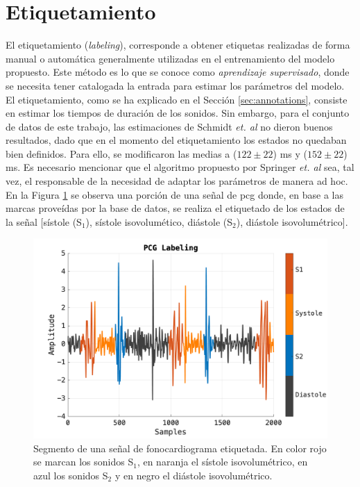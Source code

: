 \section{Etiquetamiento}

\indent El etiquetamiento (\textit{labeling}), corresponde a obtener etiquetas realizadas de forma manual o
automática generalmente utilizadas en el entrenamiento del modelo propuesto. Este método es lo que se conoce como
\textit{aprendizaje supervisado}, donde se necesita tener catalogada la entrada para estimar los parámetros del
modelo. \\
\indent El etiquetamiento, como se ha explicado en el Sección \ref{sec:annotations}, consiste en estimar los tiempos
de duración de los sonidos. Sin embargo, para el conjunto de datos de este trabajo, las estimaciones de Schmidt
\textit{et. al} no dieron buenos resultados, dado que en el momento del etiquetamiento los estados no quedaban
bien definidos. Para ello, se modificaron las medias a ($122 \pm 22$) ms y ($152 \pm 22$) ms. Es necesario mencionar
que el algoritmo propuesto por Springer \textit{et. al} sea, tal vez, el responsable de la necesidad de adaptar los
parámetros de manera ad hoc. \\
\indent En la Figura \ref{fig:pcg-labeling} se observa una porción de una señal de \acrshort{pcg} donde, en base a
las marcas proveídas por la base de datos, se realiza el etiquetado de los estados de la señal [sístole (S$_1$),
sístole isovolumético, diástole (S$_2$), diástole isovolumétrico].

\begin{figure}[H]
  \centering
  \includegraphics[scale=0.3]{chapters/chapter-04/images/pcg-labeling.png}
  \caption[Segmento de una señal de fonocardiograma etiquetada]{Segmento de una señal de fonocardiograma
  etiquetada. En color rojo se marcan los sonidos S$_1$, en naranja el sístole isovolumétrico, en azul los sonidos
  S$_2$ y en negro el diástole isovolumétrico.}
  \label{fig:pcg-labeling}
\end{figure}

